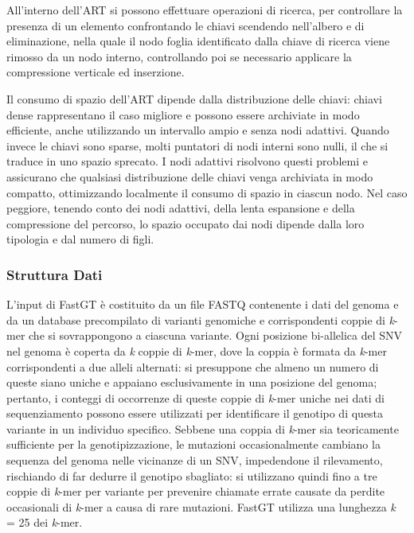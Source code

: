 \documentclass[../main.tex]{subfiles}
\begin{document}
All'interno dell'ART si possono effettuare operazioni di ricerca, per controllare la presenza di un elemento confrontando le chiavi scendendo nell'albero e di eliminazione, nella quale il nodo foglia identificato dalla chiave di ricerca viene rimosso da un nodo interno, controllando poi se necessario applicare la compressione verticale ed inserzione.

Il consumo di spazio dell'ART dipende dalla distribuzione delle chiavi: chiavi dense rappresentano il caso migliore e possono essere archiviate in modo efficiente, anche utilizzando un intervallo ampio e senza nodi adattivi. Quando invece le chiavi sono sparse, molti puntatori di nodi interni sono nulli, il che si traduce in uno spazio sprecato. I nodi adattivi risolvono questi problemi e assicurano che qualsiasi distribuzione delle chiavi venga archiviata in modo compatto, ottimizzando localmente il consumo di spazio in ciascun nodo. Nel caso peggiore, tenendo conto dei nodi adattivi, della lenta espansione e della compressione del percorso, lo spazio occupato dai nodi dipende dalla loro tipologia e dal numero di figli.

\subsubsection{Struttura Dati}
\label{strutturaDatiFastGT}

L'input di FastGT è costituito da un file FASTQ contenente i dati del genoma e da un database precompilato di varianti genomiche e corrispondenti coppie di \textit{k}-mer che si sovrappongono a ciascuna variante. Ogni posizione bi-allelica del SNV nel genoma è coperta da \textit{k} coppie di \textit{k}-mer, dove la coppia è formata da \textit{k}-mer corrispondenti a due alleli alternati: si presuppone che almeno un numero di queste siano uniche e appaiano esclusivamente in una posizione del genoma; pertanto, i conteggi di occorrenze di queste coppie di \textit{k}-mer uniche nei dati di sequenziamento possono essere utilizzati per identificare il genotipo di questa variante in un individuo specifico. Sebbene una coppia di \textit{k}-mer sia teoricamente sufficiente per la genotipizzazione, le mutazioni occasionalmente cambiano la sequenza del genoma nelle vicinanze di un SNV, impedendone il rilevamento, rischiando di far dedurre il genotipo sbagliato: si utilizzano quindi fino a tre coppie di \textit{k}-mer per variante per prevenire chiamate errate causate da perdite occasionali di \textit{k}-mer a causa di rare mutazioni. FastGT utilizza una lunghezza \textit{k }= 25 dei \textit{k}-mer. \\
\end{document}
